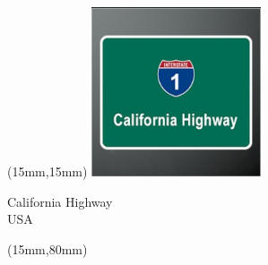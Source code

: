 \begin{textblock*}{50mm}(15mm,15mm)%
\includegraphics[width=50mm]{LG/2015-05-20_00077.png}
\par California Highway\\ USA
\end{textblock*}
\begin{textblock*}{185mm}(15mm,80mm)%
\end{textblock*}
